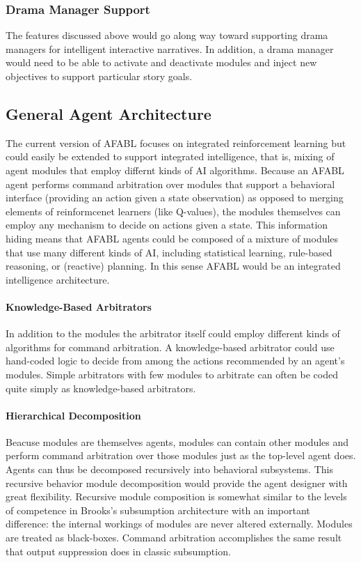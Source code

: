 \subsubsection{Drama Manager Support}

The features discussed above would go along way toward supporting drama managers for intelligent interactive narratives. In addition, a drama manager would need to be able to activate and deactivate modules and inject new objectives to support particular story goals.

\subsection{General Agent Architecture}

The current version of AFABL focuses on integrated reinforcement learning but could easily be extended to support integrated intelligence, that is, mixing of agent modules that employ differnt kinds of AI algorithms. Because an AFABL agent performs command arbitration over modules that support a behavioral interface (providing an action given a state observation) as opposed to merging elements of reinformcenet learners (like Q-values), the modules themselves can employ any mechanism to decide on actions given a state.  This information hiding means that AFABL agents could be composed of a mixture of modules that use many different kinds of AI, including statistical learning, rule-based reasoning, or (reactive) planning.  In this sense AFABL would be an integrated intelligence architecture.

\paragraph{Knowledge-Based Arbitrators}

In addition to the modules the arbitrator itself could employ different kinds of algorithms for command arbitration. A knowledge-based arbitrator could use hand-coded logic to decide from among the actions recommended by an agent's modules.  Simple arbitrators with few modules to arbitrate can often be coded quite simply as knowledge-based arbitrators.

\paragraph{Hierarchical Decomposition}

Beacuse modules are themselves agents, modules can contain other modules and perform command arbitration over those modules just as the top-level agent does.  Agents can thus be decomposed recursively into behavioral subsystems.  This recursive behavior module decomposition would provide the agent designer with great flexibility.  Recursive module composition is somewhat similar to the levels of competence in Brooks's subsumption architecture with an important difference: the internal workings of modules are never altered externally.  Modules are treated as black-boxes.  Command arbitration accomplishes the same result that output suppression does in classic subsumption.

